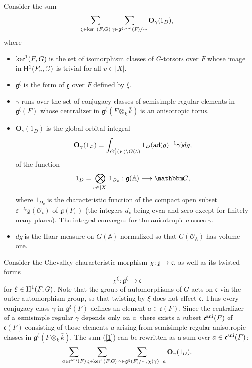 \documentclass[12pt,english]{smfart}
\numberwithin{equation}{subsection}
\theoremstyle{remark}
\newcommand\frakg{{\mathfrak g}}
\newcommand\frakc{{\mathfrak c}}
\newcommand\bfO{{\mathbf O}}
\newcommand\CC{{\mathbbm C}}
\newcommand\rmH{{\rm H}}
\newcommand\ani{{\rm ani}}
\begin{document}
Consider the sum
\begin{equation}\label{1}
\sum_{\xi\in {\rm ker}^1(F,G)} \sum_{\gamma\in {\mathfrak g}^{\xi,\ani}(F)/{\sim}} \bfO_\gamma(1_D),
\end{equation}
where
\begin{itemize}
    \item ${\rm ker}^1(F,G)$ is the set of isomorphism classes of $G$-torsors over $F$ whose image in $\rmH^1(F_v,G)$ is trivial for all $v\in|X|$.
    \item ${\mathfrak g}^\xi$ is the form of ${\mathfrak g}$ over $F$ defined by $\xi$.
    \item $\gamma$ runs over the set of conjugacy classes of semisimple regular elements in ${\mathfrak g}^\xi(F)$ whose centralizer in $\frakg^\xi(F\otimes_{k} \bar k)$ is an anisotropic torus.
    \item $\bfO_\gamma(1_D)$ is the global orbital integral
    $$
    \bfO_\gamma(1_D)=\int_{G_\gamma^\xi(F)\backslash G({\mathbb A})}
    1_{D}({\rm ad}(g)^{-1}\gamma) dg,
    $$
    of the function
    $$1_D=\bigotimes_{v\in |X|} 1_{D_v}:\frakg({\mathbb A})\longrightarrow \CC,$$
    where $1_{D_v}$ is the characteristic function of the compact open subset $\varepsilon^{-d_v}{\mathfrak g}({\mathcal O}_v)$ of ${\mathfrak g}(F_v)$ (the integers $d_v$ being even and zero except for finitely many places). The integral converges for the anisotropic classes $\gamma$.
    \item $dg$ is the Haar measure on $G({\mathbb A})$ normalized so that $G({\mathcal O}_{{\mathbb A}})$ has volume one.
\end{itemize}

Consider the Chevalley characteristic morphism $\chi:\frakg\rightarrow \frakc$, as well as its twisted forms
$$\chi^\xi :\frakg^\xi \longrightarrow \frakc$$
for $\xi\in\rmH^1(F,G)$. Note that the group of automorphisms of $G$ acts on $\frakc$ via the outer automorphism group, so that twisting by $\xi$ does not affect $\frakc$. Thus every conjugacy class $\gamma$ in $\frakg^\xi(F)$ defines an element $a\in\frakc(F)$. Since the centralizer of a semisimple regular $\gamma$ depends only on $a$, there exists a subset $\frakc^\ani(F)$ of $\frakc(F)$ consisting of those elements $a$ arising from semisimple regular anisotropic classes in $\frakg^{\xi}(F\otimes_{k} \bar k)$. The sum (\ref{1}) can be rewritten as a sum over $a\in\frakc^\ani(F)$:
\begin{equation}\label{2}
\sum_{a\in\frakc^\ani(F)}
\sum_{\xi\in {\rm ker}^1(F,G)}
\sum_{ {\gamma\in {\mathfrak g}^\xi(F)/{\scriptscriptstyle \sim} },\, {\chi(\gamma)=a}   }
\bfO_\gamma(1_D).
\end{equation}
\end{document}
